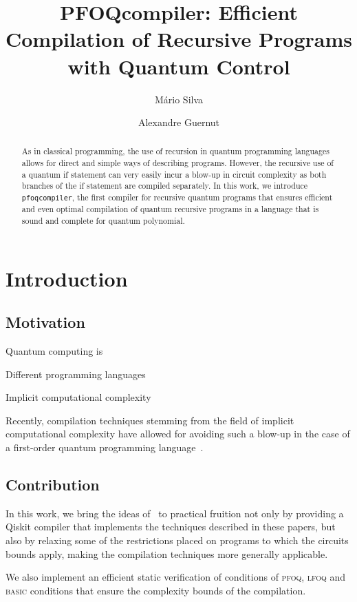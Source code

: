 \documentclass[a4paper,onecolumn,11pt,unpublished]{quantumarticle}
\title{PFOQcompiler: Efficient Compilation of Recursive Programs with Quantum Control}
\author{Mário Silva}
\affiliation{Universit\'{e} Paris-Saclay, Inria, CNRS, LMF, 91190 Gif-sur-Yvette, France}
\author{Alexandre Guernut}
\affiliation{Affiliation}
\newcommand{\unif}{\textnormal{\textsc{basic}}}
\newcommand{\pfoq}{\textnormal{\textsc{pfoq}}}
\newcommand{\lfoq}{\textnormal{\textsc{lfoq}}}
\newcommand{\pfoqcompiler}{\texttt{pfoqcompiler}}
\begin{document}
\maketitle

\begin{abstract}
    As in classical programming, the use of recursion in quantum programming languages allows for direct and simple ways of describing programs. However, the recursive use of a quantum if statement can very easily incur a blow-up in circuit complexity as both branches of the if statement are compiled separately. In this work, we introduce \pfoqcompiler{}, the first compiler for recursive quantum programs that ensures efficient and even optimal compilation of quantum recursive programs in a language that is sound and complete for quantum polynomial.
\end{abstract}

\section{Introduction}

\subsection{Motivation} Quantum computing is 

Different programming languages


Implicit computational complexity~\cite{DL11,P20}

Recently, compilation techniques stemming from the field of implicit computational complexity have allowed for avoiding such a blow-up in the case of a first-order quantum programming language~\cite{HPS23,HPS25}.



\subsection{Contribution}

In this work, we bring the ideas of~\cite{HPS23,HPS25,FHPS25} to practical fruition not only by providing a Qiskit compiler that implements the techniques described in these papers, but also by relaxing some of the restrictions placed on programs to which the circuits bounds apply, making the compilation techniques more generally applicable.

We also implement an efficient static verification of conditions of \pfoq{}, \lfoq{} and \unif{} conditions that ensure the complexity bounds of the compilation.
\end{document}
